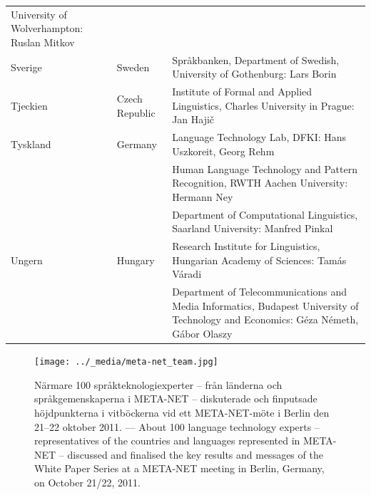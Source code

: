 \begin{longtable}{llp{114mm}}
  University of Wolverhampton: Ruslan Mitkov \\ \addlinespace  
  Sverige & \textcolor{grey1}{Sweden} & Språkbanken, Department of Swedish, University of Gothenburg: Lars Borin \\ \addlinespace
  Tjeckien & \textcolor{grey1}{Czech Republic} & Institute of Formal and Applied Linguistics, Charles University in Prague: Jan Hajič \\ \addlinespace
  Tyskland & \textcolor{grey1}{Germany} & Language Technology Lab, DFKI: Hans Uszkoreit, Georg Rehm\\ \addlinespace
  & & Human Language Technology and Pattern Recognition, RWTH Aachen University: Hermann Ney \\ \addlinespace
  & & Department of Computational Linguistics, Saarland University: Manfred Pinkal\\ \addlinespace   
  Ungern & \textcolor{grey1}{Hungary} & Research Institute for Linguistics, Hungarian Academy of Sciences: Tamás Váradi\\  \addlinespace
  & & Department of Telecommunications and Media Informatics, Budapest University of Technology and Economics: Géza Németh, Gábor Olaszy
\end{longtable}
\normalsize

\renewcommand*{\figureformat}{}
\renewcommand*{\captionformat}{}

\begin{figure}[htbp]
  \center
  \texttt{[image: ../\_media/meta-net\_team.jpg]}
  \caption{Närmare 100 språkteknologiexperter -- från länderna och
    språkgemenskaperna i META-NET -- diskuterade och finputsade
    höjdpunkterna i vitböckerna vid ett META-NET-möte i Berlin den
    21--22 oktober 2011. --- \textcolor{grey1}{About 100 language
      technology experts -- representatives of the countries and
      languages represented in META-NET -- discussed and finalised the
      key results and messages of the White Paper Series at a META-NET
      meeting in Berlin, Germany, on October 21/22, 2011.}}
\end{figure}

\cleardoublepage

\label{whitepaperseries}

